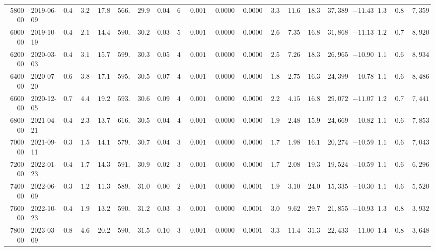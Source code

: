 \begin{tabular}{rlllllllllllllllllll}
580000 & 2019-06-09 & $0.46$ & $3.22$ & $17.83$ & $566.5$ & $29.92$ & $0.045$ & $66$ & $0.00177$ & $0.000027$ & $0.000060$ & $3.31$ & $11.66$ & $18.39$ & $37,389$ & $-11.43$ & $1.34$ & $0.80$ & $7,359$ \\
600000 & 2019-10-19 & $0.40$ & $2.15$ & $14.41$ & $590.2$ & $30.26$ & $0.030$ & $54$ & $0.00169$ & $0.000031$ & $0.000059$ & $2.62$ & $7.35$ & $16.89$ & $31,868$ & $-11.13$ & $1.23$ & $0.72$ & $8,920$ \\
620000 & 2020-03-03 & $0.49$ & $3.19$ & $15.78$ & $599.2$ & $30.36$ & $0.050$ & $45$ & $0.00167$ & $0.000037$ & $0.000064$ & $2.58$ & $7.26$ & $18.34$ & $26,965$ & $-10.90$ & $1.18$ & $0.67$ & $8,934$ \\
640000 & 2020-07-20 & $0.60$ & $3.89$ & $17.15$ & $595.1$ & $30.52$ & $0.075$ & $41$ & $0.00168$ & $0.000041$ & $0.000069$ & $1.87$ & $2.75$ & $16.30$ & $24,399$ & $-10.78$ & $1.16$ & $0.65$ & $8,486$ \\
660000 & 2020-12-05 & $0.75$ & $4.44$ & $19.22$ & $593.3$ & $30.67$ & $0.095$ & $49$ & $0.00169$ & $0.000034$ & $0.000068$ & $2.25$ & $4.15$ & $16.81$ & $29,072$ & $-11.07$ & $1.26$ & $0.74$ & $7,441$ \\
680000 & 2021-04-21 & $0.46$ & $2.32$ & $13.70$ & $616.7$ & $30.52$ & $0.040$ & $40$ & $0.00162$ & $0.000041$ & $0.000072$ & $1.92$ & $2.48$ & $15.92$ & $24,669$ & $-10.82$ & $1.19$ & $0.68$ & $7,853$ \\
700000 & 2021-09-11 & $0.38$ & $1.58$ & $14.13$ & $579.3$ & $30.71$ & $0.045$ & $35$ & $0.00173$ & $0.000049$ & $0.000084$ & $1.78$ & $1.98$ & $16.16$ & $20,274$ & $-10.59$ & $1.16$ & $0.65$ & $7,043$ \\
720000 & 2022-01-23 & $0.40$ & $1.72$ & $14.32$ & $591.6$ & $30.98$ & $0.020$ & $33$ & $0.00169$ & $0.000051$ & $0.000090$ & $1.77$ & $2.08$ & $19.38$ & $19,524$ & $-10.59$ & $1.19$ & $0.68$ & $6,296$ \\
740000 & 2022-06-09 & $0.34$ & $1.26$ & $11.30$ & $589.8$ & $31.04$ & $0.005$ & $26$ & $0.00170$ & $0.000065$ & $0.000109$ & $1.90$ & $3.10$ & $24.06$ & $15,335$ & $-10.30$ & $1.15$ & $0.64$ & $5,520$ \\
760000 & 2022-10-23 & $0.43$ & $1.95$ & $13.28$ & $590.7$ & $31.25$ & $0.030$ & $37$ & $0.00169$ & $0.000046$ & $0.000108$ & $3.05$ & $9.62$ & $29.75$ & $21,855$ & $-10.93$ & $1.37$ & $0.82$ & $3,932$ \\
780000 & 2023-03-09 & $0.86$ & $4.65$ & $20.23$ & $590.3$ & $31.52$ & $0.100$ & $38$ & $0.00169$ & $0.000045$ & $0.000111$ & $3.31$ & $11.43$ & $31.38$ & $22,433$ & $-11.00$ & $1.40$ & $0.84$ & $3,648$ \\

\end{tabular}
